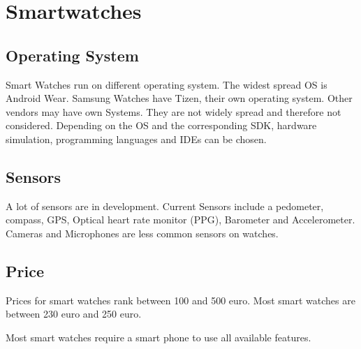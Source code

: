 \section{Smartwatches}

\subsection{Operating System}
Smart Watches run on different operating system. The widest spread OS is Android Wear. Samsung Watches have Tizen, their own operating system.
Other vendors may have own Systems. They are not widely spread and therefore not considered. Depending on the OS and the corresponding SDK, hardware simulation, programming languages and IDEs can be chosen. 

\subsection{Sensors}
A lot of sensors are in development. Current Sensors include a pedometer, compass, GPS, Optical heart rate monitor (PPG), Barometer  and Accelerometer. Cameras and Microphones are less common sensors on watches.

\subsection{Price}
Prices for smart watches rank between 100 and 500 euro. Most smart watches are  between 230 euro and 250 euro.

Most smart watches require a smart phone to use all available features. 

